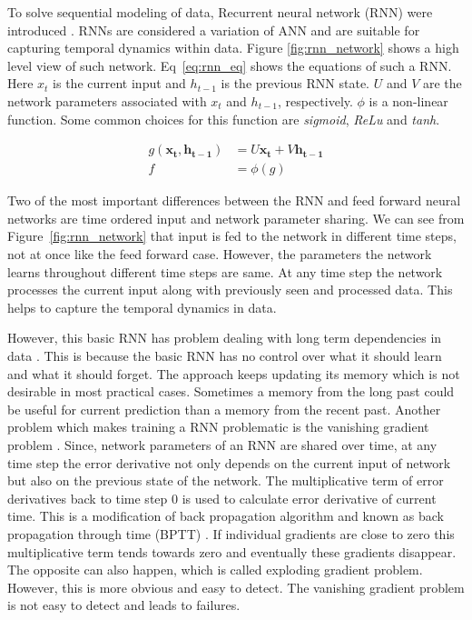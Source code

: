 \documentclass[10pt,twocolumn,letterpaper]{article}
\begin{document}
To solve sequential modeling of data, Recurrent neural network (RNN) were 
introduced \cite{DBLP:journals/corr/Lipton15}. RNNs are considered a  variation of ANN and are 
suitable for capturing temporal dynamics within 
data. Figure \ref{fig:rnn_network} shows a high level view of such network. 
Eq~\ref{eq:rnn_eq} shows the equations of such a  RNN. Here $x_t$ is the current input and $h_{t-1}$ is the previous RNN state. $U$ and $V$ are the network parameters associated with $x_t$ and $h_{t-1}$,
respectively. $\phi$ is a non-linear function. Some common choices for this function are \textit{sigmoid}, \textit{ReLu} and \textit{tanh}. 

\begin{equation}
\label{eq:rnn_eq}
\begin{aligned}
g(\mathbf{x_t}, \mathbf{h_{t-1}}) & = U\mathbf{x_t} + V\mathbf{h_{t-1}} \\ f & = \phi(g)
\end{aligned}
\end{equation} 

Two of the most important differences between the 
RNN and feed forward neural networks are time ordered input and network parameter sharing. We can see 
from Figure~\ref{fig:rnn_network} that input is fed to the network in different time steps, not at once like 
the feed forward case. However,
the parameters the network learns throughout different time steps are same. At any time step the network processes the 
current input along with 
previously seen and processed data. This helps to capture the temporal dynamics in data. 


However, this 
basic RNN has problem dealing with long term dependencies in data \cite{DBLP:journals/corr/abs-1211-5063}. This is because the 
basic RNN has no control over what it should learn and what it 
should forget. The approach keeps updating its memory which is not desirable in most practical cases. Sometimes a memory from the 
long past could be useful for current prediction than a memory from the recent past. Another problem which makes training a RNN problematic 
is the  vanishing gradient problem \cite{DBLP:journals/corr/abs-1211-5063}. Since,  network parameters of an RNN are shared over time, at any time step the error derivative not only depends on the current input of network but also on the previous state of the network. The 
multiplicative term of error derivatives back to time step 0 is used 
to calculate error derivative of current time. This is a modification of back propagation algorithm and known as
back propagation through time (BPTT) \cite{58337}. If individual gradients are close to zero this multiplicative term tends towards 
zero and eventually these 
gradients disappear. The opposite can also happen, which is called exploding gradient problem.  However,
this is more obvious and easy to detect. The vanishing gradient problem is not easy to detect and leads to failures. 
\end{document}
